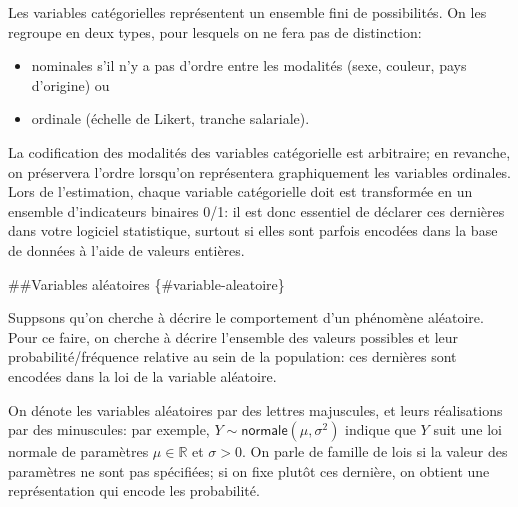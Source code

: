 \documentclass[
  11pt,
  letterpaper,
]{scrbook}
\providecommand{\tightlist}{%
  \setlength{\itemsep}{0pt}\setlength{\parskip}{0pt}}\usepackage{longtable,booktabs,array}
\theoremstyle{definition}
\theoremstyle{definition}
\theoremstyle{remark}
\begin{document}
Les variables catégorielles représentent un ensemble fini de
possibilités. On les regroupe en deux types, pour lesquels on ne fera
pas de distinction:

\begin{itemize}
\tightlist
\item
  nominales s'il n'y a pas d'ordre entre les modalités (sexe, couleur,
  pays d'origine) ou
\item
  ordinale (échelle de Likert, tranche salariale).
\end{itemize}

La codification des modalités des variables catégorielle est arbitraire;
en revanche, on préservera l'ordre lorsqu'on représentera graphiquement
les variables ordinales. Lors de l'estimation, chaque variable
catégorielle doit est transformée en un ensemble d'indicateurs binaires
0/1: il est donc essentiel de déclarer ces dernières dans votre logiciel
statistique, surtout si elles sont parfois encodées dans la base de
données à l'aide de valeurs entières.

\#\#Variables aléatoires \{\#variable-aleatoire\}

Suppsons qu'on cherche à décrire le comportement d'un phénomène
aléatoire. Pour ce faire, on cherche à décrire l'ensemble des valeurs
possibles et leur probabilité/fréquence relative au sein de la
population: ces dernières sont encodées dans la loi de la variable
aléatoire.

On dénote les variables aléatoires par des lettres majuscules, et leurs
réalisations par des minuscules: par exemple,
\(Y \sim \mathsf{normale}(\mu, \sigma^2)\) indique que \(Y\) suit une
loi normale de paramètres \(\mu \in \mathbb{R}\) et \(\sigma > 0\). On
parle de famille de lois si la valeur des paramètres ne sont pas
spécifiées; si on fixe plutôt ces dernière, on obtient une
représentation qui encode les probabilité.
\end{document}
